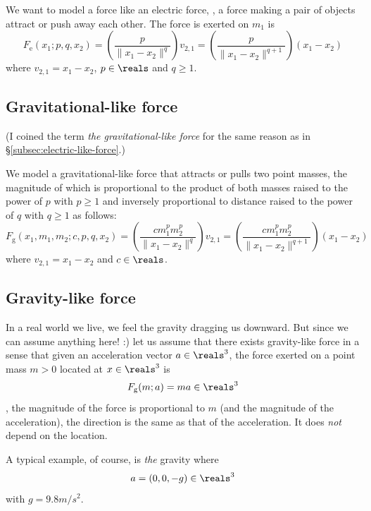 \documentclass{article}
\begin{document}
We want to model a force like an electric force,
\ie,
a force making a pair of objects
attract or push away each other.
The force is exerted on $m_1$ is
\begin{equation}
\label{eq:force:eletric-like}
	F_\mathrm{e}(x_1;p,q,x_2)
	= \left(\frac{p}{\|x_1-x_2\|^q} \right) v_{2,1}
	= \left(\frac{p}{\|x_1-x_2\|^{q+1}} \right) (x_1-x_2)
\end{equation}
where $v_{2,1} = x_1-x_2$, $p\in\reals$ and $q\geq1$.

\subsection{Gravitational-like force}

(I coined the term \emph{the gravitational-like force} for the same reason as in \S\ref{subsec:electric-like-force}.)

We model a gravitational-like force that attracts or pulls two point masses,
the magnitude of which is proportional to the product of both masses raised to the power of $p$ with $p\geq1$
and inversely proportional to distance raised to the power of $q$ with $q\geq1$ as follows:
\begin{equation}
\label{eq:force:gravitational-like}
	F_\mathrm{g}(x_1,m_1,m_2;c,p,q,x_2)
	= \left(\frac{c m_1^pm_2^p}{\|x_1-x_2\|^q} \right) v_{2,1}
	= \left(\frac{c m_1^pm_2^p}{\|x_1-x_2\|^{q+1}} \right) (x_1-x_2)
\end{equation}
where $v_{2,1} = x_1-x_2$ and $c\in\reals$.

\subsection{Gravity-like force}

In a real world we live, we feel the gravity dragging us downward.
But since we can assume anything here! :)
let us assume that there exists gravity-like force
in a sense that given an acceleration vector $a\in\reals^3$,
the force exerted on a point mass $m>0$ located at $x\in\reals^3$
is
\begin{equation}
\label{eq:force:gravity-like}
F_\mathrm{g}(m;a) = ma
	\in\reals^3
\end{equation}
\ie,
the magnitude of the force is proportional to $m$ (and the magnitude of the acceleration),
the direction is the same as that of the acceleration.
It does \emph{not} depend on the location.

A typical example, of course, is \emph{the} gravity where
\[
	a = (0,0,-g)
	\in\reals^3
\]
with $g = 9.8 m/s^2$.
\end{document}
